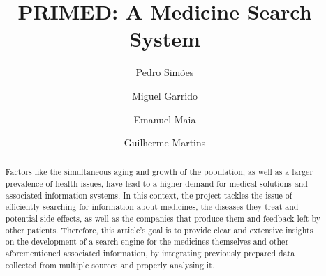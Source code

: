 \documentclass[sigconf]{acmart}
\begin{document}
\title{PRIMED: A Medicine Search System}

\author{Pedro Simões}

\author{Miguel Garrido}

\author{Emanuel Maia}

\author{Guilherme Martins}

\renewcommand{\shortauthors}{Pedro Simões, Miguel Garrido, Emanuel Maia and Guilherme Martins}

\begin{abstract}
    Factors like the simultaneous aging and growth of the population, as well as a larger prevalence of health issues, have lead to a higher demand for medical solutions and associated information systems. In this context, the project tackles the issue of efficiently searching for information about medicines, the diseases they treat and potential side-effects, as well as the companies that produce them and feedback left by other patients.
    Therefore, this article's goal is to provide clear and extensive insights on the development of a search engine for the medicines themselves and other aforementioned associated information, by integrating previously prepared data collected from multiple sources and properly analysing it.
\end{abstract}
\end{document}
